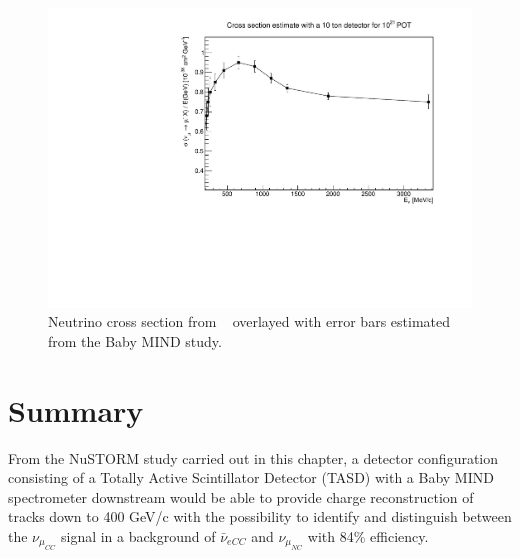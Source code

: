 \begin{figure}[h!]
\centering
\includegraphics[width=.9\textwidth]{figures/NeutrinoChap/NuSTORM/CrossSecEstimate.pdf}
\caption{Neutrino cross section from ~ overlayed with error bars estimated from the Baby MIND study.}
\label{fig:crossSecEst}
\end{figure}






\pagebreak
\newpage

\section{Summary}
From the NuSTORM study carried out in this chapter, a detector configuration consisting of a Totally Active Scintillator Detector (TASD) with a Baby MIND spectrometer downstream would be able to provide charge reconstruction of tracks down to 400 GeV/c with the possibility to identify and distinguish between the $\nu_{\mu_{CC}}$ signal in a background of $\bar{\nu}_{eCC}$ and $\nu_{\mu_{NC}}$ with 84\% efficiency.

